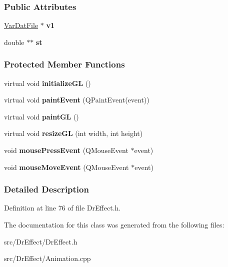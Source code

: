 \subsubsection*{Public Attributes}
\begin{DoxyCompactItemize}
\item 
\hyperlink{classVarDatFile}{Var\+Dat\+File} $\ast$ {\bfseries v1}\hypertarget{classAnimation_af8d0da3e35bb5e28aba9329efffbfb95}{}\label{classAnimation_af8d0da3e35bb5e28aba9329efffbfb95}

\item 
double $\ast$$\ast$ {\bfseries st}\hypertarget{classAnimation_a6bd842874c8ee75e7889fabdbb9f98b2}{}\label{classAnimation_a6bd842874c8ee75e7889fabdbb9f98b2}

\end{DoxyCompactItemize}
\subsubsection*{Protected Member Functions}
\begin{DoxyCompactItemize}
\item 
virtual void {\bfseries initialize\+GL} ()\hypertarget{classAnimation_a2d3d45239c78255c23a70ca558b4d4f1}{}\label{classAnimation_a2d3d45239c78255c23a70ca558b4d4f1}

\item 
virtual void {\bfseries paint\+Event} (Q\+Paint\+Event(event))\hypertarget{classAnimation_adc7aa19ed77af08ab367a6cb77d2c13c}{}\label{classAnimation_adc7aa19ed77af08ab367a6cb77d2c13c}

\item 
virtual void {\bfseries paint\+GL} ()\hypertarget{classAnimation_ac5cbfafb28ef4c0474ae96437294f547}{}\label{classAnimation_ac5cbfafb28ef4c0474ae96437294f547}

\item 
virtual void {\bfseries resize\+GL} (int width, int height)\hypertarget{classAnimation_a3efe88f982dbec7825725dd954991139}{}\label{classAnimation_a3efe88f982dbec7825725dd954991139}

\item 
void {\bfseries mouse\+Press\+Event} (Q\+Mouse\+Event $\ast$event)\hypertarget{classAnimation_ad2272e344e46519f026cd02f419884f1}{}\label{classAnimation_ad2272e344e46519f026cd02f419884f1}

\item 
void {\bfseries mouse\+Move\+Event} (Q\+Mouse\+Event $\ast$event)\hypertarget{classAnimation_ae820c6a86f0a1908bf451f86db043489}{}\label{classAnimation_ae820c6a86f0a1908bf451f86db043489}

\end{DoxyCompactItemize}


\subsubsection{Detailed Description}


Definition at line 76 of file Dr\+Effect.\+h.



The documentation for this class was generated from the following files\+:\begin{DoxyCompactItemize}
\item 
src/\+Dr\+Effect/Dr\+Effect.\+h\item 
src/\+Dr\+Effect/Animation.\+cpp\end{DoxyCompactItemize}
